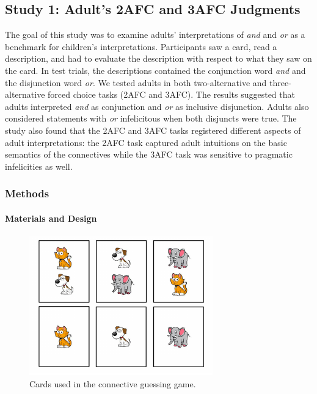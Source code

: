 \documentclass[floatsintext,man]{apa6}
\theoremstyle{definition}
\theoremstyle{definition}
\theoremstyle{definition}
\theoremstyle{remark}
\begin{document}
\subsection{Study 1: Adult's 2AFC and 3AFC Judgments}\label{study1}

The goal of this study was to examine adults' interpretations of
\emph{and} and \emph{or} as a benchmark for children's interpretations.
Participants saw a card, read a description, and had to evaluate the
description with respect to what they saw on the card. In test trials,
the descriptions contained the conjunction word \emph{and} and the
disjunction word \emph{or}. We tested adults in both two-alternative and
three-alternative forced choice tasks (2AFC and 3AFC). The results
suggested that adults interpreted \emph{and} as conjunction and
\emph{or} as inclusive disjunction. Adults also considered statements
with \emph{or} infelicitous when both disjuncts were true. The study
also found that the 2AFC and 3AFC tasks registered different aspects of
adult interpretations: the 2AFC task captured adult intuitions on the
basic semantics of the connectives while the 3AFC task was sensitive to
pragmatic infelicities as well.

\subsubsection{Methods}\label{methods}

\paragraph{Materials and Design}\label{materials-and-design}

\begin{figure}[!h]

{\centering \includegraphics{figs/stimuli-1} 

}

\caption{Cards used in the connective guessing game.}\label{fig:stimuli}
\end{figure}
\end{document}
